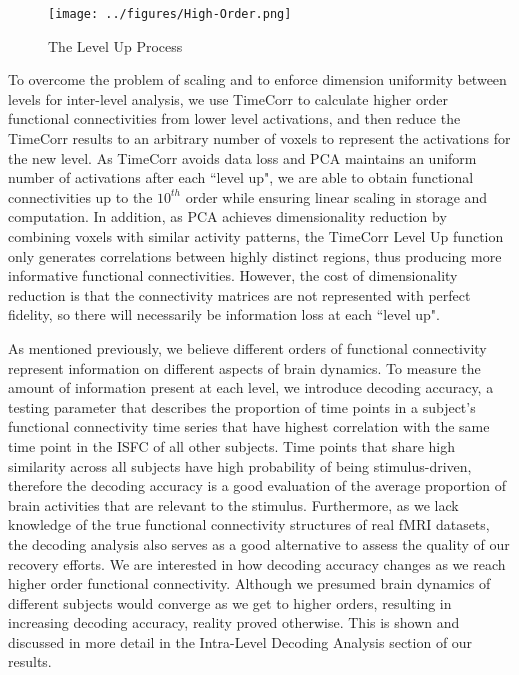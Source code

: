 \documentclass[11pt]{article}
\begin{document}
\begin{figure}[!htb]
\setlength{\belowcaptionskip}{15pt}
\caption{The Level Up Process}
\centering
\texttt{[image: ../figures/High-Order.png]}
\label{fig:HighOrder}
\end{figure}

To overcome the problem of scaling and to enforce dimension uniformity between levels for inter-level analysis, we use TimeCorr to calculate higher order functional connectivities from lower level activations, and then reduce the TimeCorr results to an arbitrary number of voxels to represent the activations for the new level. As TimeCorr avoids data loss and PCA maintains an uniform number of activations after each ``level up", we are able to obtain functional connectivities up to the $10^{th}$ order while ensuring linear scaling in storage and computation. In addition, as PCA achieves dimensionality reduction by combining voxels with similar activity patterns, the TimeCorr Level Up function only generates correlations between highly distinct regions, thus producing more informative functional connectivities. However, the cost of dimensionality reduction is that the connectivity matrices are not represented with perfect fidelity, so there will necessarily be information loss at each ``level up".

As mentioned previously, we believe different orders of functional connectivity represent information on different aspects of brain dynamics. To measure the amount of information present at each level, we introduce decoding accuracy, a testing parameter that describes the proportion of time points in a subject's functional connectivity time series that have highest correlation with the same time point in the ISFC of all other subjects. Time points that share high similarity across all subjects have high probability of being stimulus-driven, therefore the decoding accuracy is a good evaluation of the average proportion of brain activities that are relevant to the stimulus. Furthermore, as we lack knowledge of the true functional connectivity structures of real fMRI datasets, the decoding analysis also serves as a good alternative to assess the quality of our recovery efforts. We are interested in how decoding accuracy changes as we reach higher order functional connectivity. Although we presumed brain dynamics of different subjects would converge as we get to higher orders, resulting in increasing decoding accuracy, reality proved otherwise. This is shown and discussed in more detail in the Intra-Level Decoding Analysis section of our results.
\end{document}
